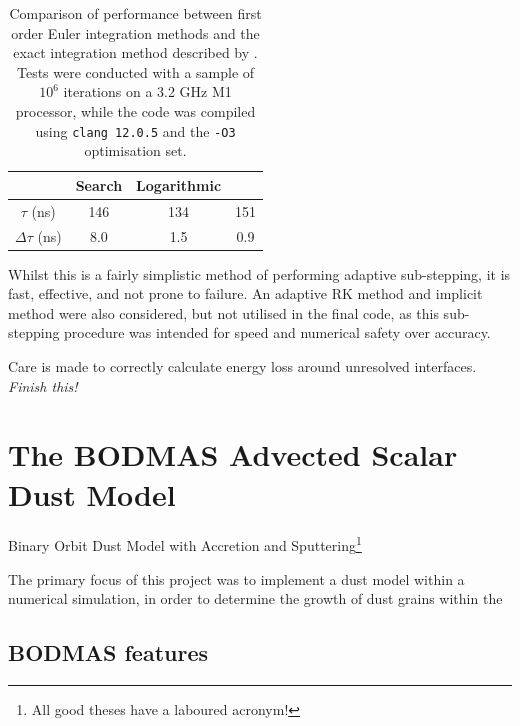\begin{table}
  \centering
  \begin{tabular}{cccc}
  \hline
  & \textbf{Search} & \textbf{Logarithmic} & \textbf{\cite{townsendExactIntegrationScheme2009}} \\ \hline
  $\tau$ (\si{\nano\second}) & 146 & 134 & 151 \\
  $\Delta \tau$ (\si{\nano\second}) & 8.0 & 1.5 & 0.9 \\ \hline
  \end{tabular}
  \caption[Cooling method performance comparison]{Comparison of performance between first order Euler integration methods and the exact integration method described by \cite{townsendExactIntegrationScheme2009}. Tests were conducted with a sample of $10^6$ iterations on a 3.2 \si{\giga\hertz} M1 processor, while the code was compiled using \texttt{clang 12.0.5} and the \texttt{-O3} optimisation set.}
  \label{tab:cooling-loop-speed-comp}
\end{table}

Whilst this is a fairly simplistic method of performing adaptive sub-stepping, it is fast, effective, and not prone to failure. An adaptive RK method and implicit method were also considered, but not utilised in the final code, as this sub-stepping procedure was intended for speed and numerical safety over accuracy.


Care is made to correctly calculate energy loss around unresolved interfaces. \textit{Finish this!}



\section{The BODMAS Advected Scalar Dust Model}
\label{sec:bodmas}

Binary Orbit Dust Model with Accretion and Sputtering\footnote{All good theses have a laboured acronym!}

The primary focus of this project was to implement a dust model within a numerical simulation, in order to determine the growth of dust grains within the 

\subsection{BODMAS features}



